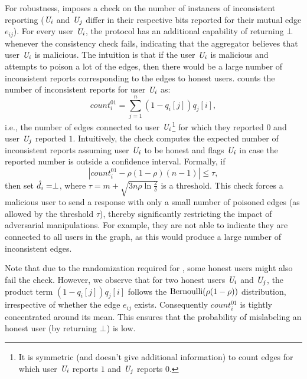 For robustness, \DegRRCheck{} imposes a check on the number of instances of
inconsistent reporting ($\textit{U}_i$ and $\textit{U}_j$ differ in their respective bits reported for their mutual
edge $e_{ij}$). For every user $\textit{U}_i$,  the protocol has an
additional capability of returning $\bot$ whenever the  consistency check fails, indicating
that the aggregator believes that user $\textit{U}_i$ is malicious. The intuition is that if the user $\textit{U}_i$ is malicious and attempts to poison a lot of the edges, then there would be a large number of inconsistent reports corresponding to the edges to honest users. \DegRRCheck{}  counts the number of inconsistent reports for user $\textit{U}_i$ as: 
\[
  count_i^{01} = \sum_{j=1}^n (1-q_{i}[j]) q_{j}[i],
\]
i.e., the number of edges connected to user $\textit{U}_i$\footnote{It is symmetric (and doesn't give additional information) to count edges for which user $\textit{U}_i$ reports $1$ and $\textit{U}_j$ reports $0$.} for
which they reported $0$ and user $\textit{U}_j$ reported $1$. Intuitively, the check computes the expected number of inconsistent reports assuming user $\textit{U}_i$ to be honest and flags $\textit{U}_i$ in case the reported number is outside a confidence interval. Formally, if
\begin{equation}\label{eq:deg-check}
    |count_{i}^{01} - \rho(1-\rho)(n-1)| \leq \tau,
\end{equation}
then set $\hat{d}_i = \perp$, where $\tau=m + \sqrt{3 n \rho \ln \tfrac{2}{\delta}}$ is a threshold.  This check forces a malicious user to send a response with only a small number of poisoned edges (as allowed by the threshold $\tau$), thereby significantly restricting the impact of adversarial manipulations. For example, they are not able to indicate they are connected to all users in the graph, as this would produce a large number of inconsistent edges. 

Note that due to the randomization required for \ldp, some honest users might also fail the check. However,  we observe that for two honest users $\textit{U}_i$ and $\textit{U}_j$,  the product term
$(1-q_{i}[j]) q_{j}[i]$ follows the $ \textnormal{Bernoulli}(\rho(1-\rho))$ distribution, irrespective of whether the edge $e_{ij}$ exists. Consequently $count_{i}^{01}$  is tightly concentrated around its mean.  This ensures that the probability of mislabeling an honest user (by returning $\perp$) is low. 
\setlength{\textfloatsep}{4pt}

